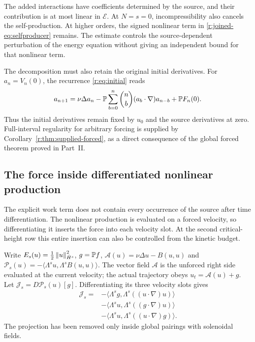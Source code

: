 The added interactions have coefficients determined by the source,
and their contribution is at most linear in \(\mathscr E\).
At \(N=s=0\), incompressibility also cancels the self-production.
At higher orders, the signed nonlinear term in
\eqref{r:joined-eq:selfproducer} remains. The estimate controls the
source-dependent perturbation of the energy equation without giving
an independent bound for that nonlinear term.

The decomposition must also retain the original initial derivatives.
For \(a_n=V_n(0)\), the recurrence \eqref{r:eq:initial} reads
\begin{equation}\label{r:joined-eq:initialjet}
a_{n+1}=\nu\Delta a_n
-\mathbb P\sum_{b=0}^{n}\binom nb(a_b\cdot\nabla)a_{n-b}
+\mathbb P F_n(0).
\end{equation}
Thus the initial derivatives remain fixed by \(u_0\) and the
source derivatives at zero. Full-interval regularity for arbitrary
forcing is supplied by Corollary~\ref{r:thm:supplied-forced}, as a direct
consequence of the global forced theorem proved in Part~II.


\subsection{The force inside differentiated nonlinear production}

The explicit work term does not contain every occurrence of the source after time differentiation. The nonlinear production is evaluated on a forced velocity, so differentiating it inserts the force into each velocity slot. At the second critical-height row this entire insertion can also be controlled from the kinetic budget.

Write $E_s(u)=\frac12\left\lVert u\right\rVert_{\dot H^s}^2$, $g=\mathbb P f$,
$\mathcal A(u)=\nu\Delta u-B(u,u)$ and
$\mathcal P_s(u)=-\langle\Lambda^su,\Lambda^sB(u,u)\rangle$.
The vector field $\mathcal A$ is the unforced right side evaluated at the current velocity; the actual trajectory obeys $u_t=\mathcal A(u)+g$.
Let $\mathcal J_s=D\mathcal P_s(u)[g]$. Differentiating its three velocity slots gives
\begin{equation}\label{r:joined-eq:sourceinsertion}
\begin{aligned}
\mathcal J_s={}&-\langle\Lambda^sg,\Lambda^s((u\cdot\nabla)u)\rangle\\
&-\langle\Lambda^su,\Lambda^s((g\cdot\nabla)u)\rangle\\
&-\langle\Lambda^su,\Lambda^s((u\cdot\nabla)g)\rangle .
\end{aligned}
\end{equation}
The projection has been removed only inside global pairings with solenoidal fields.

